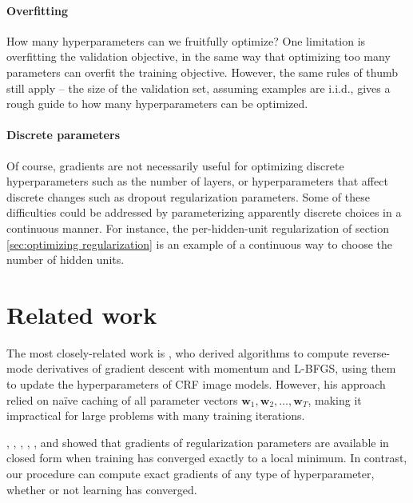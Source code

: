 \documentclass{article}
\newcommand{\vw}{\mathbf{w}}
\newcommand{\params}{\vw}
\begin{document}
\paragraph{Overfitting}
How many hyperparameters can we fruitfully optimize?
One limitation is overfitting the validation objective, in the same way that optimizing too many parameters can overfit the training objective.
However, the same rules of thumb still apply -- the size of the validation set, assuming examples are i.i.d., gives a rough guide to how many hyperparameters can be optimized.



\paragraph{Discrete parameters}
Of course, gradients are not necessarily useful for optimizing discrete hyperparameters such as the number of layers, or hyperparameters that affect discrete changes such as dropout regularization parameters.
Some of these difficulties could be addressed by parameterizing apparently discrete choices in a continuous manner.
For instance, the per-hidden-unit regularization of section \ref{sec:optimizing regularization} is an example of a continuous way to choose the number of hidden units.




\section{Related work}

The most closely-related work is \citet{domke2012generic}, who derived algorithms to compute reverse-mode derivatives of gradient descent with momentum and L-BFGS, using them to update the hyperparameters of CRF image models.
However, his approach relied on na\"ive caching of all parameter vectors $\params_1, \params_2, \dots, \params_T$, making it impractical for large problems with many training iterations.

\citet{larsen1998adaptive}, \citet{eigenmann1999gradient}, \citet{chen1999optimal}, \citet{bengio2000gradient}, \citet{abdel2007adaptive}, and \citet{foo2008efficient} showed that gradients of regularization parameters are available in closed form when training has converged exactly to a local minimum.
In contrast, our procedure can compute exact gradients of any type of hyperparameter, whether or not learning has converged.
\end{document}
